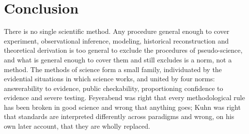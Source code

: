 \documentclass{situationist-preprint}
\begin{document}
\section{Conclusion}

There is no single scientific method. Any procedure general enough to cover experiment, observational inference, modeling, historical reconstruction and theoretical derivation is too general to exclude the procedures of pseudo-science, and what is general enough to cover them and still excludes is a norm, not a method. The methods of science form a small family, individuated by the evidential situations in which science works, and united by four norms: answerability to evidence, public checkability, proportioning confidence to evidence and severe testing. Feyerabend was right that every methodological rule has been broken in good science and wrong that anything goes; Kuhn was right that standards are interpreted differently across paradigms and wrong, on his own later account, that they are wholly replaced.
\end{document}
